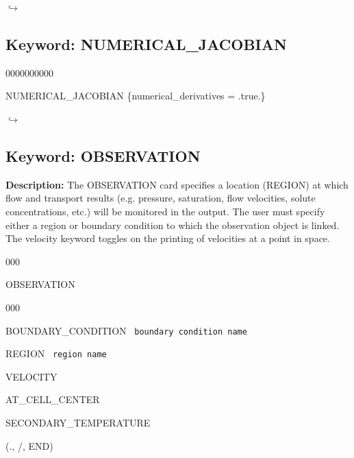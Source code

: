 \documentclass[12pt]{article}
\newcommand\return{{\hfill$\hookrightarrow$}}
\begin{document}


\hyperlink{target_key}{\return}


\newpage
\protect\hypertarget{target_numjac}{}

\subsection{Keyword: NUMERICAL\_JACOBIAN}
\begin{deflist}{0000000000}
\item[NUMERICAL\_JACOBIAN] \{numerical\_derivatives = .true.\}
\end{deflist}

\hyperlink{target_key}{\return}


\newpage
\protect\hypertarget{target_observation}{}

\subsection{Keyword: OBSERVATION}

{\noindent\bf Description:}
The OBSERVATION card specifies a location (REGION) at which flow and transport results (e.g. pressure, saturation, flow velocities, solute concentrations, etc.) will be monitored in the output.
The user must specify either a region or boundary condition to which the observation object is linked.  The velocity keyword toggles on the printing of velocities at a point in space.

\begin{deflist}{000}
\item[OBSERVATION] ~
\begin{deflist}{000}
\item[BOUNDARY\_CONDITION] \ {\tt boundary condition name}
\item[REGION] \ {\tt region name}
\item[VELOCITY]
\item[AT\_CELL\_CENTER]
\item[SECONDARY\_TEMPERATURE]
\end{deflist}
\item[(., /, END)]
\end{deflist}
\end{document}
